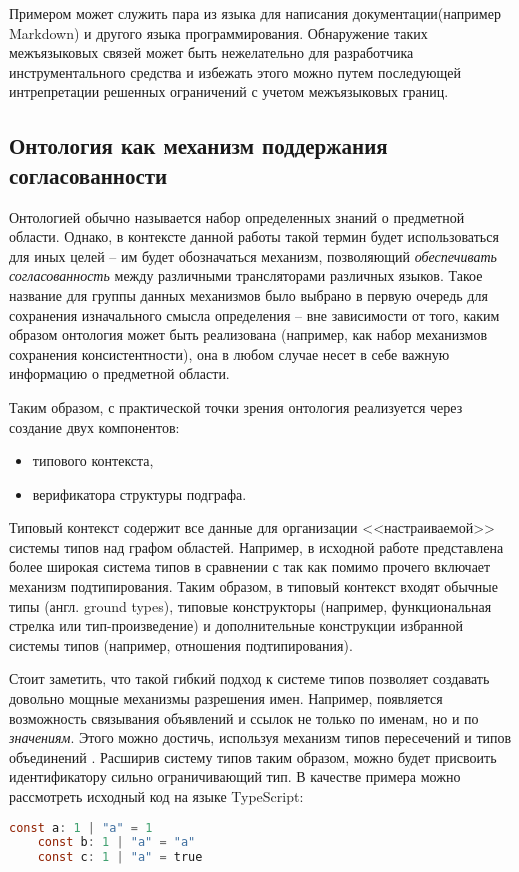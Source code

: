 Примером может служить пара из языка для написания документации(например Markdown) и другого языка программирования.
Обнаружение таких межъязыковых связей может быть нежелательно для разработчика инструментального средства и
избежать этого можно путем последующей интрепретации решенных ограничений с учетом межъязыковых границ.

\subsection{Онтология как механизм поддержания согласованности} \label{ssec:ontology}

Онтологией обычно называется набор определенных знаний о предметной области.
Однако, в контексте данной работы такой термин будет использоваться для иных целей -- им будет
обозначаться механизм, позволяющий \textit{обеспечивать согласованность} между различными
трансляторами различных языков. Такое название для группы данных механизмов было выбрано
в первую очередь для сохранения изначального смысла определения -- вне зависимости от того,
каким образом онтология может быть реализована (например, как набор механизмов сохранения консистентности),
она в любом случае несет в себе важную информацию о предметной области.

Таким образом, с практической точки зрения онтология реализуется через создание двух компонентов:
\begin{itemize}
    \item типового контекста,
    \item верификатора структуры подграфа.
\end{itemize}

Типовый контекст содержит все данные для организации <<настраиваемой>> системы типов над графом областей.
Например, в исходной работе \cite{scope-graphs-typed}
представлена более широкая система типов в сравнении с \cite{scope-graphs-static-analysis} так как помимо прочего включает
механизм подтипирования. Таким образом, в типовый контекст входят обычные типы (англ. ground types), типовые конструкторы
(например, функциональная стрелка или тип-произведение) и дополнительные конструкции избранной системы типов (например, отношения подтипирования).

Стоит заметить, что такой гибкий подход к системе типов позволяет создавать довольно мощные механизмы разрешения имен. Например,
появляется возможность связывания объявлений и ссылок не только по именам, но и по \textit{значениям}. Этого можно достичь, используя
механизм типов пересечений и типов объединений \cite{DEZANICIANCAGLINI1992303}.
Расширив систему типов таким образом, можно будет присвоить идентификатору сильно ограничивающий тип. В качестве примера можно рассмотреть
исходный код на языке TypeScript:
\begin{lstlisting}[language=C,style=simplecode,caption={Пример использования типов-объединений в TypeScript}]
    const a: 1 | "a" = 1
    const b: 1 | "a" = "a"
    const c: 1 | "a" = true
\end{lstlisting}

